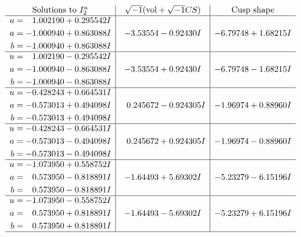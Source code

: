 \documentclass[1p]{elsarticle_modified}
\theoremstyle{definition}
\newcommand{\I}{\sqrt{-1}}
\begin{document}
$$\begin{array}{c|c|c}  
\text{Solutions to }I^u_{2}& \I (\text{vol} + \sqrt{-1}CS) & \text{Cusp shape}\\
 \hline 
\begin{aligned}
u &= \phantom{-}1.002190 + 0.295542 I \\
a &= -1.000940 + 0.863088 I \\
b &= -1.000940 + 0.863088 I\end{aligned}
 & -3.53554 - 0.92430 I & -6.79748 + 1.68215 I \\ \hline\begin{aligned}
u &= \phantom{-}1.002190 - 0.295542 I \\
a &= -1.000940 - 0.863088 I \\
b &= -1.000940 - 0.863088 I\end{aligned}
 & -3.53554 + 0.92430 I & -6.79748 - 1.68215 I \\ \hline\begin{aligned}
u &= -0.428243 + 0.664531 I \\
a &= -0.573013 + 0.494098 I \\
b &= -0.573013 + 0.494098 I\end{aligned}
 & \phantom{-}0.245672 - 0.924305 I & -1.96974 + 0.88960 I \\ \hline\begin{aligned}
u &= -0.428243 - 0.664531 I \\
a &= -0.573013 - 0.494098 I \\
b &= -0.573013 - 0.494098 I\end{aligned}
 & \phantom{-}0.245672 + 0.924305 I & -1.96974 - 0.88960 I \\ \hline\begin{aligned}
u &= -1.073950 + 0.558752 I \\
a &= \phantom{-}0.573950 - 0.818891 I \\
b &= \phantom{-}0.573950 - 0.818891 I\end{aligned}
 & -1.64493 + 5.69302 I & -5.23279 - 6.15196 I \\ \hline\begin{aligned}
u &= -1.073950 - 0.558752 I \\
a &= \phantom{-}0.573950 + 0.818891 I \\
b &= \phantom{-}0.573950 + 0.818891 I\end{aligned}
 & -1.64493 - 5.69302 I & -5.23279 + 6.15196 I\\
 \hline 
 \end{array}$$\newpage
\newpage\renewcommand{\arraystretch}{1}
\end{document}
